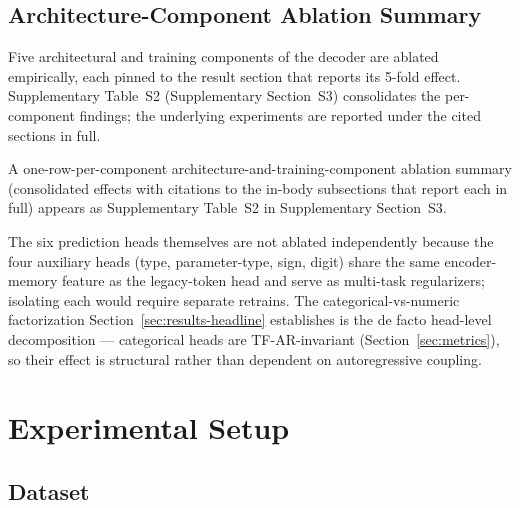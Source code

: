 \documentclass[sensors,article,submit,moreauthors,pdftex]{Definitions/mdpi}
\begin{document}
\subsection{Architecture-Component Ablation Summary}
\label{sec:arch-ablation-summary}

Five architectural and training components of the decoder are ablated empirically, each pinned to the result section that reports its 5-fold effect. Supplementary Table~S2 (Supplementary Section~S3) consolidates the per-component findings; the underlying experiments are reported under the cited sections in full.

A one-row-per-component architecture-and-training-component ablation summary (consolidated effects with citations to the in-body subsections that report each in full) appears as Supplementary Table~S2 in Supplementary Section~S3.

The six prediction heads themselves are not ablated independently because the four auxiliary heads (type, parameter-type, sign, digit) share the same encoder-memory feature as the legacy-token head and serve as multi-task regularizers; isolating each would require separate retrains. The categorical-vs-numeric factorization Section~\ref{sec:results-headline} establishes is the de facto head-level decomposition --- categorical heads are TF-AR-invariant (Section~\ref{sec:metrics}), so their effect is structural rather than dependent on autoregressive coupling.

\section{Experimental Setup}
\label{sec:setup}

\subsection{Dataset}
\label{sec:dataset}
\end{document}
